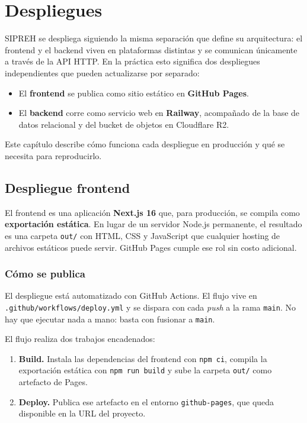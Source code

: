 \chapter{Despliegues}
\label{ch:despliegues}

SIPREH se despliega siguiendo la misma separación que define su arquitectura: el frontend y el backend viven en plataformas distintas y se comunican únicamente a través de la API HTTP. En la práctica esto significa dos despliegues independientes que pueden actualizarse por separado:

\begin{itemize}
    \item El \textbf{frontend} se publica como sitio estático en \textbf{GitHub Pages}.
    \item El \textbf{backend} corre como servicio web en \textbf{Railway}, acompañado de la base de datos relacional y del bucket de objetos en Cloudflare R2.
\end{itemize}

Este capítulo describe cómo funciona cada despliegue en producción y qué se necesita para reproducirlo.

\section{Despliegue frontend}
\label{sec:deploy_frontend}

El frontend es una aplicación \textbf{Next.js 16} que, para producción, se compila como \textbf{exportación estática}. En lugar de un servidor Node.js permanente, el resultado es una carpeta \texttt{out/} con HTML, CSS y JavaScript que cualquier hosting de archivos estáticos puede servir. GitHub Pages cumple ese rol sin costo adicional.

\subsection*{Cómo se publica}

El despliegue está automatizado con GitHub Actions. El flujo vive en \texttt{.github/workflows/deploy.yml} y se dispara con cada \textit{push} a la rama \texttt{main}. No hay que ejecutar nada a mano: basta con fusionar a \texttt{main}.

El flujo realiza dos trabajos encadenados:

\begin{enumerate}
    \item \textbf{Build.} Instala las dependencias del frontend con \texttt{npm ci}, compila la exportación estática con \texttt{npm run build} y sube la carpeta \texttt{out/} como artefacto de Pages.
    \item \textbf{Deploy.} Publica ese artefacto en el entorno \texttt{github-pages}, que queda disponible en la URL del proyecto.
\end{enumerate}

